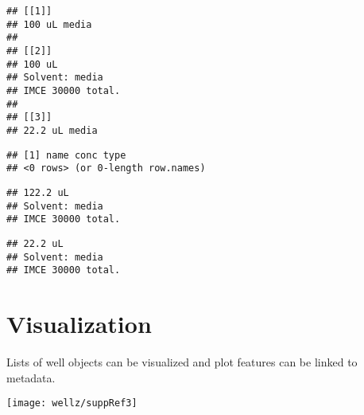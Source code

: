 \begin{knitrout}
\begin{kframe}
\begin{alltt}
\end{alltt}
\begin{verbatim}
## [[1]]
## 100 uL media
## 
## [[2]]
## 100 uL 
## Solvent: media
## IMCE 30000 total.
## 
## [[3]]
## 22.2 uL media
\end{verbatim}
\begin{alltt}
\hlstd{solutions[[}\hlstd{]]}\hlopt{$}
\end{alltt}
\begin{verbatim}
## [1] name conc type
## <0 rows> (or 0-length row.names)
\end{verbatim}
\begin{alltt}
\hlstd{solutions[[}\hlstd{]]} \hlopt{+} \hlstd{solutions[[}\hlstd{]]}
\end{alltt}
\begin{verbatim}
## 122.2 uL 
## Solvent: media
## IMCE 30000 total.
\end{verbatim}
\begin{alltt}
\hlstd{solutions[[}\hlstd{]]} \hlopt{+} \hlstd{solutions[[}\hlstd{]]} \hlopt{-} \hlstd{solutions[[}\hlstd{]]}
\end{alltt}
\begin{verbatim}
## 22.2 uL 
## Solvent: media
## IMCE 30000 total.
\end{verbatim}
\end{kframe}
\end{knitrout}

\section{Visualization}

Lists of well objects can be visualized and plot features can be linked to metadata.

\begin{knitrout}
\color{fgcolor}\begin{kframe}
\begin{alltt}
  \hlstd{=} \hlstd{,}
     \hlstd{=} \hlstd{,}
     \hlstd{=} \hlstd{)}
\end{alltt}
\end{kframe}
\texttt{[image: wellz/suppRef3]} 
\end{knitrout}

